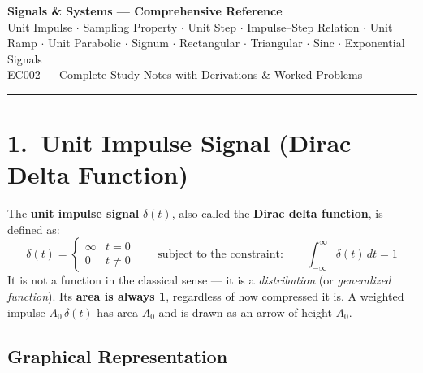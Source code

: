\documentclass[10pt,a4paper]{article}
\newcommand{\Int}{\displaystyle\int_{-\infty}^{\infty}}
\begin{document}
\begin{center}
  {\LARGE\bfseries\color{headcolor} Signals \& Systems --- Comprehensive Reference}\\[4pt]
  {\normalsize\color{darkgreen}
    Unit Impulse $\cdot$ Sampling Property $\cdot$ Unit Step $\cdot$ Impulse--Step Relation
    $\cdot$ Unit Ramp $\cdot$ Unit Parabolic $\cdot$ Signum $\cdot$ Rectangular
    $\cdot$ Triangular $\cdot$ Sinc $\cdot$ Exponential Signals}\\[2pt]
  {\small\color{gray} EC002 --- Complete Study Notes with Derivations \& Worked Problems}
\end{center}
\vspace{2pt}
{\color{darkgreen}\rule{\linewidth}{1.5pt}}
\vspace{4pt}

\section{1.\ Unit Impulse Signal (Dirac Delta Function)}

\begin{defbox}
The \textbf{unit impulse signal} $\delta(t)$, also called the \textbf{Dirac delta function}, is defined as:
\[
  \delta(t) = \begin{cases} \infty & t = 0 \\ 0 & t \neq 0 \end{cases}
  \qquad \text{subject to the constraint:} \qquad
  \Int \delta(t)\,dt = 1
\]
It is not a function in the classical sense --- it is a \emph{distribution} (or \emph{generalized function}).
Its \textbf{area is always 1}, regardless of how compressed it is.
A weighted impulse $A_0\,\delta(t)$ has area $A_0$ and is drawn as an arrow of height $A_0$.
\end{defbox}

\subsection*{Graphical Representation}
\end{document}
